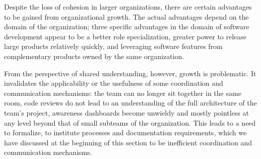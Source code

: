 Despite the loss of cohesion in larger organizations, there are certain advantages to be gained from organizational growth. The actual advantages depend on the domain of the organization; three specific advantages in the domain of software development appear to be a better role specialization, greater power to release large products relatively quickly, and leveraging software features from complementary products owned by the same organization.

From the perspective of shared understanding, however, growth is problematic. It invalidates the applicability or the usefulness of some coordination and communication mechanisms: the team can no longer sit together in the same room, code reviews do not lead to an understanding of the full architecture of the team's project, awareness dashboards become unwieldy and mostly pointless at any level beyond that of small subteams of the organization. This leads to a need to formalize, to institute processes and documentation requirements, which we have discussed at the beginning of this section to be inefficient coordination and communication mechanisms.

